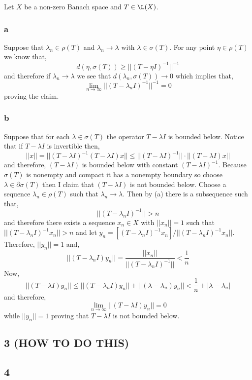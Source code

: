 \documentclass[12pt]{article}
\begin{document}
Let $X$ be a non-zero Banach space and $T \in \L(X)$.

\subsubsection{a}

Suppose that $\lambda_n \in \rho(T)$ and $\lambda_n \to \lambda$ with $\lambda \in \sigma(T)$. For any point $\eta \in \rho(T)$ we know that,
\[ d(\eta, \sigma(T)) \ge || (T - \eta I)^{-1} ||^{-1} \]
and therefore if $\lambda_n \to \lambda$ we see that $d(\lambda_n, \sigma(T)) \to 0$ which implies that,
\[ \lim_{n \to \infty} || (T - \lambda_n I)^{-1} ||^{-1} = 0 \]
proving the claim.

\subsubsection{b}

Suppose that for each $\lambda \in \sigma(T)$ the operator $T - \lambda I$ is bounded below. Notice that if $T - \lambda I$ is invertible then,
\[ || x || = || (T - \lambda I)^{-1} (T - \lambda I) x || \le || (T - \lambda I)^{-1} || \cdot || (T - \lambda I) x || \]
and therefore, $(T - \lambda I)$ is bounded below with constant $(T - \lambda I)^{-1}$. Because $\sigma(T)$ is nonempty and compact it has a nonempty boundary so choose $\lambda \in \partial \sigma(T)$ then I claim that $(T - \lambda I)$ is not bounded below. Choose a sequence $\lambda_n \in \rho(T)$ such that $\lambda_n \to \lambda$. Then by (a) there is a subsequence such that,
\[ || (T - \lambda_n I)^{-1} || > n \]
and therefore there exists a sequence $x_n \in X$ with $|| x_n || = 1$ such that $|| (T - \lambda _n I)^{-1} x_n || > n$ and let $y_n = [(T - \lambda_n I)^{-1} x_n]/||(T - \lambda_n I)^{-1} x_n||$. Therefore, $|| y_n || = 1$ and,
\[ || (T - \lambda_n I) y_n || = \frac{|| x_n ||}{|| (T - \lambda_n I)^{-1}||} < \frac{1}{n} \]
Now,
\[ || (T - \lambda I) y_n || \le || (T - \lambda_n I) y_n || + || (\lambda - \lambda_n) y_n || < \frac{1}{n} + | \lambda - \lambda_n | \]
and therefore,
\[ \lim_{n \to \infty} || (T - \lambda I) y_n || = 0 \]
while $|| y_n || = 1$ proving that $T - \lambda I$ is not bounded below.

\subsection{3 (HOW TO DO THIS)}

\subsection{4}
\end{document}
